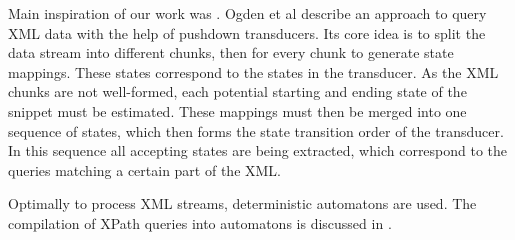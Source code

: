  Main inspiration of our work was \cite{Ogden2013}. Ogden et
al describe an approach to query XML data with the help of pushdown transducers.
Its core idea is to split the data stream into different chunks, then for every chunk to generate state mappings. These states correspond to the states in the transducer. As the XML chunks are not well-formed, each potential starting and ending state of the snippet must be estimated. These mappings must then be merged into one sequence of states, which then forms the state transition order of the transducer. In this sequence all accepting states are being extracted, which correspond to the queries matching a certain part of the XML.

Optimally to process XML streams, deterministic automatons are used. The
compilation of XPath queries into automatons is discussed in \cite{Green2004}.


%

